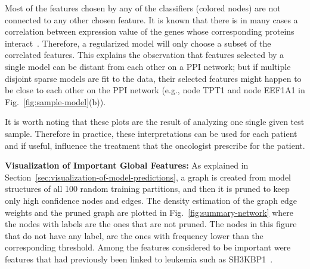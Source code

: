 Most of the features chosen by any of the classifiers (colored nodes) are not connected to any other chosen feature. It is known that there is in many cases a correlation between expression value of the genes whose corresponding proteins interact~\cite{jansen2002relating}.
Therefore, a regularized model will only choose a subset of the correlated features. This explains the observation that features selected by a single model can be distant from each other on a PPI network; but if multiple disjoint sparse models are fit to the data, their selected features might happen to be close to each other on the PPI network (e.g., node TPT1 and node EEF1A1 in Fig.~\ref{fig:sample-model}(b)).

It is worth noting that these plots are the result of analyzing one single given test sample. Therefore in practice, these interpretations can be used for each patient and if useful, influence the treatment that the oncologist prescribe for the patient.


\textbf{Visualization of Important Global Features:}
As explained in Section~\ref{sec:visualization-of-model-predictions}, a graph is created from model structures of all 100 random training partitions, and then it is pruned to keep only high confidence nodes and edges.
The density estimation of the graph edge weights and the pruned graph are plotted in Fig.~\ref{fig:summary-network} where the nodes with labels are the ones that are not pruned. The nodes in this figure that do not have any label, are the ones with frequency lower than the corresponding threshold. Among the features considered to be important were features that had previously been linked to leukemia such as SH3KBP1~\cite{Adelaide2010}.

